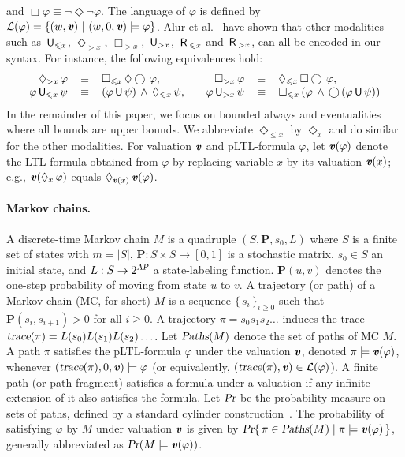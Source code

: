 \documentclass{llncs}
\newcommand{\Paths}{\mbox{\sl Paths}}
\newcommand{\smAP}{\mbox{\scriptsize \sl AP}}
\renewcommand{\Pr}{\mbox{\rm Pr}}
\renewcommand{\Pr}{\mbox{\sl Pr}}
\def\bfP{\mathbf{P}}
\newcommand{\set}[1]{\{ \, #1 \, \}}
\newcommand{\Next}{\bigcirc \, }
\newcommand{\Until}{\mbox{$\, {\sf U}\,$}}
\newcommand{\R}{\mbox{$\, {\sf R}\,$}}
\newcommand{\U}{\Until}
\newcommand{\X}{\Next}
\newcommand{\trace}{\mbox{\sl trace}}
\renewcommand{\L}{{\cal L}}
\renewcommand{\leq}{\leqslant}
\renewcommand{\geq}{\geqslant}
\renewcommand{\a}[1]{\textbf{\textit{#1}}}
\newcommand{\ve}{{{\a v}}}
\newcommand{\de}{\Diamond}
\newcommand{\bo}{\Box}
\begin{document}
and $\bo \varphi \equiv \neg \de \neg \varphi$.
The language of $\varphi$ is defined by $\L(\varphi) = \{(w,{\a v}) \ |\ (w,0,{\a v})\models \varphi\}$. 
Alur et al.~\cite{DBLP:journals/tocl/AlurETP01} have shown that other modalities such as $\U\!_{\leq x}$, $\de_{> x}$, $\Box_{> x}$, $\U\!_{> x}$, 
$\R_{\leq x}$ and $\R_{> x}$, can all be encoded in our syntax.  
For instance, the following equivalences hold: 															
\begin{equation}\label{equiv}
\begin{array}{rclrcl}
\de_{> x} \, \varphi & \, \equiv \, & \Box_{\leq x} \, \de \X \varphi, & 
\Box_{> x} \, \varphi & \, \equiv \, & \de_{\leq x} \, \Box \X \varphi, 
\\
\varphi \U\!_{\leq x} \, \psi & \, \equiv \, & (\varphi \U \psi) \, \wedge \, \de_{\leq x} \, \psi, \quad 
& \varphi \U\!_{> x} \, \psi & \, \equiv \, & \Box_{\leq x} \left( \varphi \, \wedge \, \X (\varphi \U \psi) \right)
\end{array}
\end{equation}In the remainder of this paper,  we focus on bounded always and eventualities where all bounds are upper bounds.
We abbreviate $\de_{\leq x}$ by $\de_x$ and do similar for the other modalities.
For valuation ${\a v}$ and pLTL-formula $\varphi$, let ${\a v}(\varphi)$ denote the LTL formula obtained 
from $\varphi$ by replacing variable $x$ by its valuation $\ve(x)$; e.g., 
${\a v}(\de_{ x} \, \varphi)$ equals $\de_{ {\a v}(x)} \, {\a v}(\varphi)$.

\paragraph{Markov chains.}
A discrete-time Markov chain $M$ is a quadruple $(S,\bfP,s_0,L)$ where $S$ is a finite set of states with $m=|S|$,
$\bfP: S \times S \to [0,1]$ is a stochastic matrix, $s_0 \in S$ an initial state, and $L: S \to 2^{\smAP}$ a state-labeling function.  
$\bfP(u,v)$ denotes the one-step probability of moving from state $u$ to $v$.
A trajectory (or path) of a Markov chain (MC, for short) $M$ is a sequence $\set{s_i}_{i \geq 0}$ such that $\bfP(s_i,s_{i+1}) > 0$ for all $i \geq 0$.
A trajectory $\pi = s_0 s_1 s_2 \ldots$ induces the trace $\trace(\pi) = L(s_0) L(s_1) L(s_2) \ldots$.
Let $\Paths(M)$ denote the set of paths  of MC $M$.
A path $\pi$ satisfies the pLTL-formula $\varphi$ under the valuation ${\a v}$, denoted $\pi \models{\a v}(\varphi)$,  whenever $(\trace(\pi), 0,{\a v}) \models \varphi$ (or equivalently, $(\trace(\pi),{\a v})\in\mathcal{L}(\varphi)$).
A finite path (or path fragment) satisfies a formula under a valuation if any infinite extension of it also satisfies the formula.
Let $\Pr$ be the probability measure on sets of paths, defined by a standard cylinder construction~\cite{DBLP:conf/focs/Vardi85}.
The probability of satisfying $\varphi$ by $M$ under valuation ${\a v}$ is given by $\Pr \set{\pi \in \Paths(M) \mid \pi \models{\a v}(\varphi)}$, generally abbreviated as $\Pr (M \models \ve(\varphi))$. 
\end{document}
